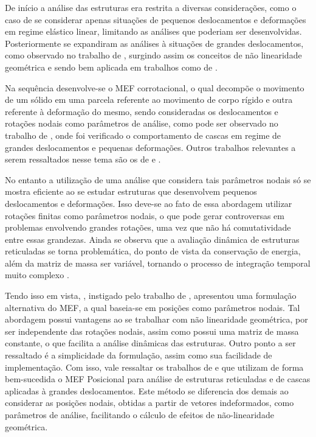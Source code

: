 De início a análise das estruturas era restrita a diversas considerações, como o caso de se considerar apenas situações de pequenos deslocamentos e deformações em regime elástico linear, limitando as análises que poderiam ser desenvolvidas. Posteriormente se expandiram as análises à situações de grandes deslocamentos, como observado no trabalho de , surgindo assim os conceitos de não linearidade geométrica e sendo bem aplicada em trabalhos como de .

Na sequência desenvolve-se o MEF corrotacional, o qual decompõe o movimento de um sólido em uma parcela referente ao movimento de corpo rígido e outra referente à deformação do mesmo, sendo consideradas os deslocamentos e rotações nodais como parâmetros de análise, como pode ser observado no trabalho de , onde foi verificado o comportamento de cascas em regime de grandes deslocamentos e pequenas deformações. Outros trabalhos relevantes a serem ressaltados nesse tema são os de  e .

No entanto a utilização de uma análise que considera tais parâmetros nodais só se mostra eficiente ao se estudar estruturas que desenvolvem pequenos deslocamentos e deformações. Isso deve-se ao fato de essa abordagem utilizar rotações finitas como parâmetros nodais, o que pode gerar controversas em problemas envolvendo grandes rotações, uma vez que não há comutatividade entre essas grandezas. Ainda se observa que a avaliação dinâmica de estruturas reticuladas se torna problemática, do ponto de vista da conservação de energia, além da matriz de massa ser variável, tornando o processo de integração temporal muito complexo \cite{sanches2013unconstrained}.

Tendo isso em vista, , instigado pelo trabalho de , apresentou uma formulação alternativa do MEF, a qual baseia-se em posições como parâmetros nodais. Tal abordagem possui vantagens ao se trabalhar com não linearidade geométrica, por ser independente das rotações nodais, assim como possui uma matriz de massa constante, o que facilita a análise dinâmicas das estruturas. Outro ponto a ser ressaltado é a simplicidade da formulação, assim como sua facilidade de implementação. Com isso, vale ressaltar os trabalhos de  e  que utilizam de forma bem-sucedida o MEF Posicional para análise de estruturas reticuladas e de cascas aplicadas à grandes deslocamentos. Este método se diferencia dos demais ao considerar as posições nodais, obtidas a partir de vetores indeformados, como parâmetros de análise, facilitando o cálculo de efeitos de não-linearidade geométrica.

